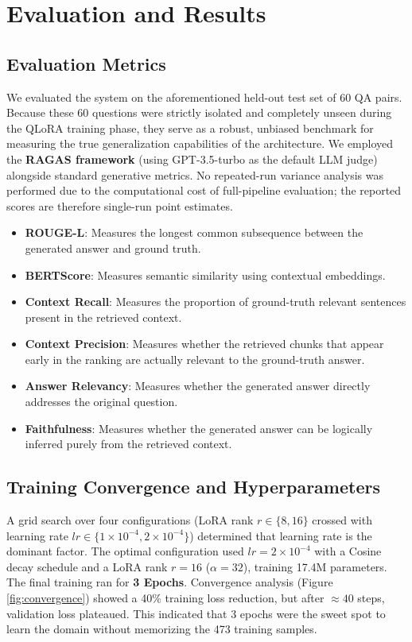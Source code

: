 \documentclass[11pt,a4paper]{article}
\begin{document}
\section{Evaluation and Results}

\subsection{Evaluation Metrics}
We evaluated the system on the aforementioned held-out test set of 60 QA pairs. Because these 60 questions were strictly isolated and completely unseen during the QLoRA training phase, they serve as a robust, unbiased benchmark for measuring the true generalization capabilities of the architecture. We employed the \textbf{RAGAS framework} \cite{es2023ragas} (using GPT-3.5-turbo as the default LLM judge) alongside standard generative metrics. No repeated-run variance analysis was performed due to the computational cost of full-pipeline evaluation; the reported scores are therefore single-run point estimates.
\begin{itemize}[noitemsep,topsep=0pt]
    \item \textbf{ROUGE-L}: Measures the longest common subsequence between the generated answer and ground truth.
    \item \textbf{BERTScore}: Measures semantic similarity using contextual embeddings.
    \item \textbf{Context Recall}: Measures the proportion of ground-truth relevant sentences present in the retrieved context.
    \item \textbf{Context Precision}: Measures whether the retrieved chunks that appear early in the ranking are actually relevant to the ground-truth answer.
    \item \textbf{Answer Relevancy}: Measures whether the generated answer directly addresses the original question.
    \item \textbf{Faithfulness}: Measures whether the generated answer can be logically inferred purely from the retrieved context.
\end{itemize}

\subsection{Training Convergence and Hyperparameters}
A grid search over four configurations (LoRA rank $r \in \{8, 16\}$ crossed with learning rate $lr \in \{1\times10^{-4}, 2\times10^{-4}\}$) determined that learning rate is the dominant factor. The optimal configuration used $lr=2\times10^{-4}$ with a Cosine decay schedule and a LoRA rank $r=16$ ($\alpha=32$), training 17.4M parameters.
The final training ran for \textbf{3 Epochs}. Convergence analysis (Figure \ref{fig:convergence}) showed a 40\% training loss reduction, but after $\approx 40$ steps, validation loss plateaued. This indicated that 3 epochs were the sweet spot to learn the domain without memorizing the 473 training samples.
\end{document}
